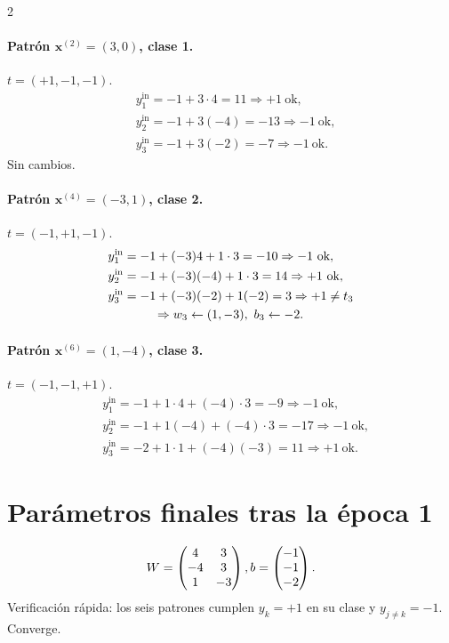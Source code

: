 \documentclass[11pt]{article}
\begin{document}
\begin{multicols}{2}
\paragraph{Patrón $\bm{x}^{(2)}=(3,0)$, clase 1.} $t=(+1,-1,-1)$.
\[
\begin{aligned}
&y^{\text{in}}_1=-1+3\cdot 4=11\Rightarrow +1\ \text{ok},\\
&y^{\text{in}}_2=-1+3(-4)=-13\Rightarrow -1\ \text{ok},\\
&y^{\text{in}}_3=-1+3(-2)=-7\Rightarrow -1\ \text{ok}.
\end{aligned}
\]
Sin cambios.

\paragraph{Patrón $\bm{x}^{(4)}=(-3,1)$, clase 2.} $t=(-1,+1,-1)$.
\[
\begin{aligned}
&y^{\text{in}}_1=-1+(-3)4+1\cdot 3=-10\Rightarrow -1\ \text{ok},\\
&y^{\text{in}}_2=-1+(-3)(-4)+1\cdot 3=14\Rightarrow +1\ \text{ok},\\
&y^{\text{in}}_3=-1+(-3)(-2)+1(-2)=3\Rightarrow +1\neq t_3\\
&\hspace{1.3cm}\Rightarrow w_3\leftarrow (1,-3),\ b_3\leftarrow -2.
\end{aligned}
\]

\paragraph{Patrón $\bm{x}^{(6)}=(1,-4)$, clase 3.} $t=(-1,-1,+1)$.
\[
\begin{aligned}
&y^{\text{in}}_1=-1+1\cdot 4+(-4)\cdot 3=-9\Rightarrow -1\ \text{ok},\\
&y^{\text{in}}_2=-1+1(-4)+(-4)\cdot 3=-17\Rightarrow -1\ \text{ok},\\
&y^{\text{in}}_3=-2+1\cdot 1+(-4)(-3)=11\Rightarrow +1\ \text{ok}.
\end{aligned}
\]

\section*{Parámetros finales tras la época 1}

\[
W=\begin{pmatrix}
4 & 3\\
-4 & 3\\
1 & -3
\end{pmatrix},
\\
b=\begin{pmatrix}
-1\\
-1\\
-2
\end{pmatrix}.
\]
Verificación rápida: los seis patrones cumplen $y_k=+1$ en su clase y $y_{j\neq k}=-1$. Converge.




\end{multicols}
\end{document}
